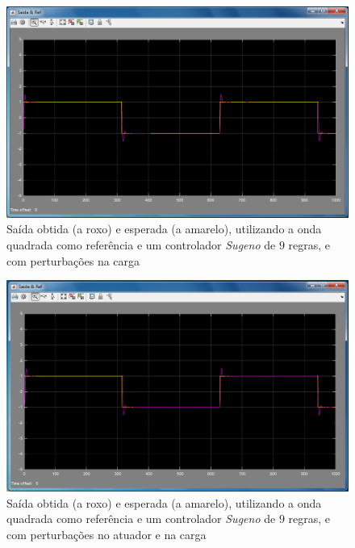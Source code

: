 \documentclass{article}
\begin{document}
\begin{figure}[h]
  \centering
      \includegraphics[scale=0.3]{Images/Sugeno_9_square_charge.png}
  \caption{Saída obtida (a roxo) e esperada (a amarelo), utilizando a onda quadrada como referência e um controlador \emph{Sugeno} de $9$ regras, e com perturbações na carga}
\end{figure}

\begin{figure}[h]
  \centering
      \includegraphics[scale=0.3]{Images/Sugeno_9_square_actuator_charge.png}
  \caption{Saída obtida (a roxo) e esperada (a amarelo), utilizando a onda quadrada como referência e um controlador \emph{Sugeno} de $9$ regras, e com perturbações no atuador e na carga}
\end{figure}

\end{document}
